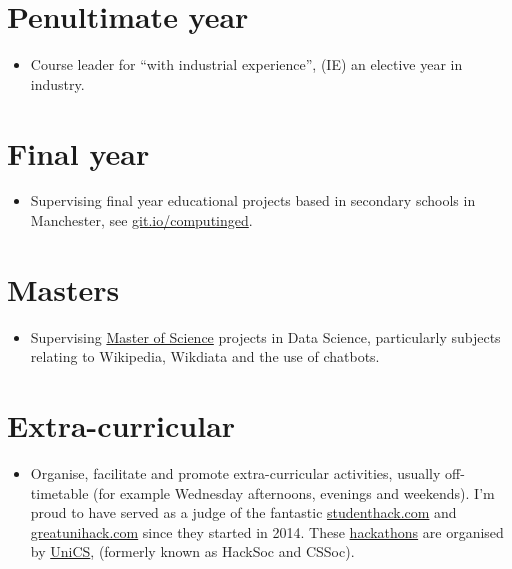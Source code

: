 \documentclass[12pt,]{book}
\providecommand{\tightlist}{%
  \setlength{\itemsep}{0pt}\setlength{\parskip}{0pt}}
\begin{document}
\hypertarget{penultimate-year}{%
\section{Penultimate year}\label{penultimate-year}}

\begin{itemize}
\tightlist
\item
  Course leader for ``with industrial experience'', (IE) an elective year in industry.
\end{itemize}

\hypertarget{final-year}{%
\section{Final year}\label{final-year}}

\begin{itemize}
\tightlist
\item
  Supervising final year educational projects based in secondary schools in Manchester, see \href{https://git.io/computinged}{git.io/computinged}.
\end{itemize}

\hypertarget{masters}{%
\section{Masters}\label{masters}}

\begin{itemize}
\tightlist
\item
  Supervising \href{https://www.cs.manchester.ac.uk/study/masters/}{Master of Science} projects in Data Science, particularly subjects relating to Wikipedia, Wikdiata and the use of chatbots.
\end{itemize}

\hypertarget{extra-curricular}{%
\section{Extra-curricular}\label{extra-curricular}}

\begin{itemize}
\tightlist
\item
  Organise, facilitate and promote extra-curricular activities, usually off-timetable (for example Wednesday afternoons, evenings and weekends). I'm proud to have served as a judge of the fantastic \href{https://www.studenthack.com}{studenthack.com} and \href{https://greatunihack.com}{greatunihack.com} since they started in 2014. These \href{https://medium.com/tfogo/hackathons-are-for-beginners-77a9c9c0e000}{hackathons} are organised by \href{https://www.unicsmcr.com/}{UniCS}, (formerly known as HackSoc and CSSoc).
\end{itemize}
\end{document}
